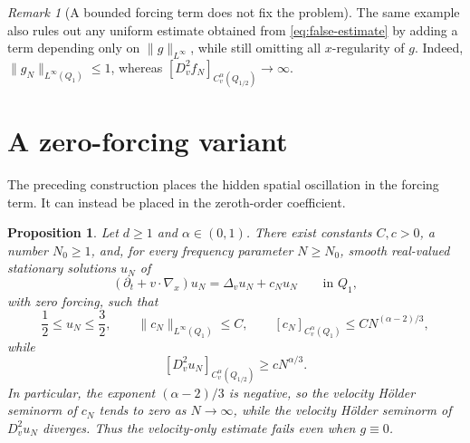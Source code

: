 \documentclass[11pt,reqno]{amsart}
\numberwithin{equation}{section}
\newtheorem{proposition}[theorem]{Proposition}
\theoremstyle{remark}
\newtheorem{remark}[theorem]{Remark}
\begin{document}
\begin{remark}[A bounded forcing term does not fix the problem]\label{rem:g-Linfty}
The same example also rules out any uniform estimate obtained from
\eqref{eq:false-estimate} by adding a term depending only on
\(\|g\|_{L^\infty}\), while still omitting all \(x\)-regularity of
\(g\).  Indeed, \(\|g_N\|_{L^\infty(Q_1)}\le1\), whereas
\([D_v^2f_N]_{C_v^\alpha(Q_{1/2})}\to\infty\).
\end{remark}

\section{A zero-forcing variant}\label{sec:zero-forcing}

The preceding construction places the hidden spatial oscillation in the forcing term.  It can instead be placed in the zeroth-order coefficient.

\begin{proposition}\label{prop:zero-forcing}
Let \(d\ge1\) and \(\alpha\in(0,1)\).  There exist constants
\(C,c>0\), a number \(N_0\ge1\), and, for every frequency parameter
\(N\ge N_0\), smooth real-valued stationary solutions \(u_N\) of
\begin{equation}\label{eq:zero-equation}
   (\partial_t+v\cdot\nabla_x)u_N=\Delta_vu_N+c_Nu_N
   \qquad\text{in }Q_1,
\end{equation}
with zero forcing, such that
\[
   \frac12\le u_N\le\frac32,
   \qquad
   \|c_N\|_{L^\infty(Q_1)}\le C,
   \qquad
   [c_N]_{C_v^\alpha(Q_1)}\le C N^{(\alpha-2)/3},
\]
while
\[
   [D_v^2u_N]_{C_v^\alpha(Q_{1/2})}\ge cN^{\alpha/3}.
\]
In particular, the exponent \((\alpha-2)/3\) is negative, so the
velocity H\"older seminorm of \(c_N\) tends to zero as \(N\to\infty\),
while the velocity H\"older seminorm of \(D_v^2u_N\) diverges.  Thus
the velocity-only estimate fails even when \(g\equiv0\).
\end{proposition}
\end{document}
